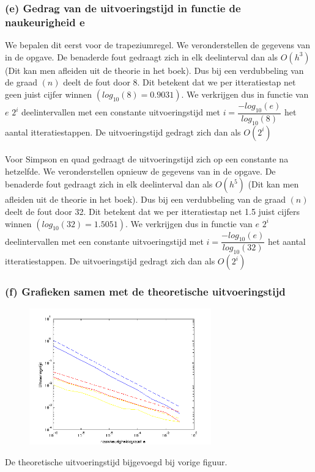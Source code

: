 \documentclass[11pt,a4paper]{article}
\begin{document}
\subsubsection*{(e) Gedrag van de uitvoeringstijd in functie de naukeurigheid e}

We bepalen dit eerst voor de trapeziumregel. We veronderstellen de gegevens van in de opgave. De benaderde fout gedraagt zich in elk deelinterval dan als $O(h^3)$ (Dit kan men afleiden uit de theorie in het boek). Dus bij een verdubbeling van de graad $(n)$ deelt de fout door 8. Dit betekent dat we per itteratiestap net geen juist cijfer winnen $(log_{10}(8) = 0.9031)$. We verkrijgen dus in functie van $e$ $2^i$ deelintervallen met een constante uitvoeringstijd met $i =\dfrac{-log_{10}(e)}{log_{10}(8)}$ het aantal itteratiestappen. De uitvoeringstijd gedragt zich dan als $O(2^i)$
\\
\\
Voor Simpson en quad gedraagt de uitvoeringstijd zich op een constante na hetzelfde. We veronderstellen opnieuw de gegevens van in de opgave. De benaderde fout gedraagt zich in elk deelinterval dan als $O(h^5)$ (Dit kan men afleiden uit de theorie in het boek). Dus bij een verdubbeling van de graad $(n)$ deelt de fout door 32. Dit betekent dat we per itteratiestap net 1.5 juist cijfers winnen $(log_{10}(32) = 1.5051)$. We verkrijgen dus in functie van $e$ $2^i$ deelintervallen met een constante uitvoeringstijd met $i =\dfrac{-log_{10}(e)}{log_{10}(32)}$ het aantal itteratiestappen. De uitvoeringstijd gedragt zich dan als $O(2^i)$

\subsubsection*{(f) Grafieken samen met de theoretische uitvoeringstijd}
\begin{figure}[H]
	\vspace{-20pt}
	\centering
	\includegraphics[width=0.7\textwidth]{12f.png}
	\end{figure}
De theoretische uitvoeringstijd bijgevoegd bij vorige figuur.
\end{document}
